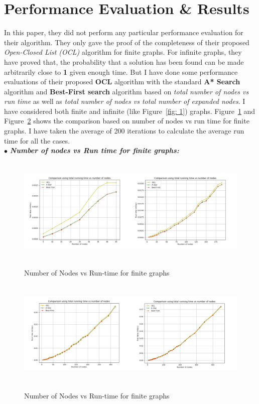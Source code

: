 \documentclass[12pt]{article}
\begin{document}
\section{Performance Evaluation \& Results}
In this paper, they did not perform any particular performance evaluation for their algorithm. They only gave the proof of the completeness of their proposed \textit{Open-Closed List (OCL)} algorithm for finite graphs. For infinite graphs, they have proved that, the probability that a solution has been found can be made arbitrarily close to \textbf{1} given enough time. But I have done some performance evaluations of their proposed \textbf{OCL} algorithm with the standard \textbf{A* Search} algorithm and \textbf{Best-First search} algorithm based on \textit{total number of nodes vs run time} as well as \textit{total number of nodes vs total number of expanded nodes}. I have considered both finite and infinite (like Figure~\ref{fig: 1}) graphs. Figure~\ref{fig: 2} and Figure~\ref{fig: 3} shows the comparison based on number of nodes vs run time for finite graphs. I have taken the average of 200 iterations to calculate the average run time for all the cases.\\

\hspace*{0.5cm}$\bullet$ \textit{\textbf{Number of nodes vs Run time for finite graphs:}}
\begin{figure}[ht]
		{\includegraphics[width=\textwidth,height=2in]{1.jpeg}}
		\caption{Number of Nodes vs Run-time for finite graphs}
        \label{fig: 2}
\end{figure}

\newpage

\begin{figure}[ht]
		{\includegraphics[width=\textwidth,height=2in]{2.jpeg}}
		\caption{Number of Nodes vs Run-time for finite graphs}
        \label{fig: 3}
\end{figure}
\end{document}
